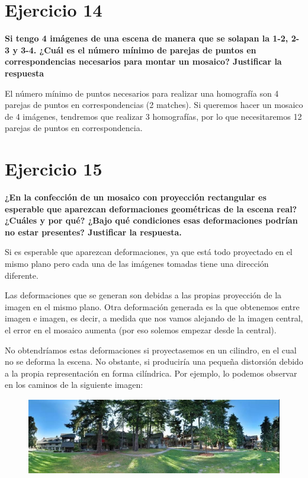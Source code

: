 \documentclass[11pt,a4paper]{article}
\begin{document}
\section*{Ejercicio 14}
\textbf{Si tengo 4 imágenes de una escena de manera que se solapan la 1-2, 2-3 y 3-4. ¿Cuál es el número mínimo de parejas de puntos en correspondencias
necesarios para montar un mosaico? Justificar la respuesta}

El número mínimo de puntos necesarios para realizar una homografía son 4 parejas de puntos en correspondencias (2 matches). Si queremos hacer un mosaico de 4
imágenes, tendremos que realizar 3 homografías, por lo que necesitaremos 12 parejas de puntos en correspondencia.


\section*{Ejercicio 15}
\textbf{¿En la confección de un mosaico con proyección rectangular es esperable que aparezcan deformaciones geométricas de la escena real? ¿Cuáles y por qué?
¿Bajo qué condiciones esas deformaciones podrían no estar presentes? Justificar la respuesta.}

Si es esperable que aparezcan deformaciones, ya que está todo proyectado en el mismo plano pero cada una de las imágenes tomadas tiene una dirección diferente.

Las deformaciones que se generan son debidas a las propias proyección de la imagen en el mismo plano. Otra deformación generada es la que obtenemos entre imagen
e imagen, es decir, a medida que nos vamos alejando de la imagen central, el error en el mosaico aumenta (por eso solemos empezar desde la central).

No obtendríamos estas deformaciones si proyectasemos en un cilindro, en el cual no se deforma la escena. No obstante, si produciría una pequeña distorsión debido
a la propia representación en forma cilíndrica.  Por ejemplo, lo podemos observar en los caminos de la siguiente imagen:
\begin{figure}[H]
\centering
\includegraphics[scale=0.6]{img/casa.png}
\end{figure}
\end{document}
